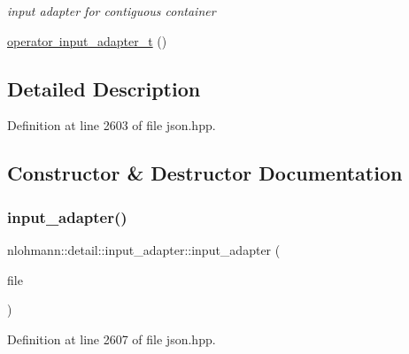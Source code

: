 \begin{DoxyCompactItemize}
\begin{DoxyCompactList}\small\item\em input adapter for contiguous container \end{DoxyCompactList}\item 
\mbox{\hyperlink{classnlohmann_1_1detail_1_1input__adapter_a4ef04b9490247fc38f3d1c2a9e18789b}{operator input\+\_\+adapter\+\_\+t}} ()
\end{DoxyCompactItemize}


\subsection{Detailed Description}


Definition at line 2603 of file json.\+hpp.



\subsection{Constructor \& Destructor Documentation}
\mbox{\label{classnlohmann_1_1detail_1_1input__adapter_a19fb8c28f37b23099a4353acf0a9a2f1}} 
\subsubsection{\texorpdfstring{input\_adapter()}{input\_adapter()}\hspace{0.1cm}{\footnotesize\ttfamily [1/11]}}
{\footnotesize\ttfamily nlohmann\+::detail\+::input\+\_\+adapter\+::input\+\_\+adapter (\begin{DoxyParamCaption}\item[{std\+::\+F\+I\+LE $\ast$}]{file }\end{DoxyParamCaption})\hspace{0.3cm}{\ttfamily [inline]}}



Definition at line 2607 of file json.\+hpp.

\mbox{\label{classnlohmann_1_1detail_1_1input__adapter_ae89f11268d4724b3080473f7218abe86}} 
